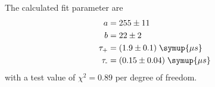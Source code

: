The calculated fit parameter are
\begin{align*}
    a &= 255 \pm 11\\
    b &= 22 \pm 2 \\
    \tau_{\text{+}} &= (1.9 \pm 0.1) \; \symup{\mu s}\\
    \tau_{\text{-}} &= (0.15 \pm 0.04) \; \symup{\mu s}
\end{align*}
with a test value of $\chi^2 = 0.89$ per degree of freedom. 
